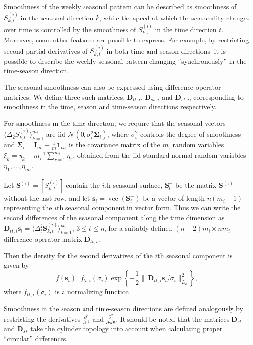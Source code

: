 \documentclass[11pt,a4paper,]{article}
\begin{document}
Smoothness of the weekly seasonal pattern can be described as smoothness of \(S^{(i)}_{k,t}\) in the seasonal direction \(k\), while the speed at which the seasonality changes over time is controlled by the smoothness of \(S^{(i)}_{k,t}\) in the time direction \(t\). Moreover, some other features are possible to express. For example, by restricting second partial derivatives of \(S^{(i)}_{k,t}\) in both time and season directions, it is possible to describe the weekly seasonal pattern changing ``synchronously'' in the time-season direction.

The seasonal smoothness can also be expressed using difference operator matrices. We define three such matrices, \(\bm{D}_{tt,i}\), \(\bm{D}_{ss,i}\) and \(\bm{D}_{st,i}\), corresponding to smoothness in the time, season and time-season directions respectively.

For smoothness in the time direction, we require that the seasonal vectors \(\langle \Delta_2 S^{(i)}_{k,t} \rangle_{k=1}^{m_i}\) are iid \(\mathcal{N}(0,\sigma_{i}^2 \bm{\Sigma}_{i} )\), where \(\sigma_i^2\) controls the degree of smoothness and \(\bm{\Sigma}_{i} = \bm{I}_{m_i} - \frac1m\bm{1}_{m_i}\) is the covariance matrix of the \(m_i\) random variables \(\xi_k = \eta_k - m_i^{-1}\sum\limits_{r = 1}^{m_i}\eta_r\), obtained from the iid standard normal random variables \(\eta_1,\dots,\eta_{m_i}\).

Let \(\bm{S}^{(i)} = [S_{k,t}^{(i)}]\) contain the \(i\)th seasonal surface, \(\bm{S}_i^{-}\) be the matrix \(\bm{S}^{(i)}\) without the last row, and let \(\bm{s}_i = \operatorname{vec}(\bm{S}_i^{-})\) be a vector of length \(n(m_i-1)\) representing the \(i\)th seasonal component in vector form. Thus we can write the second differences of the seasonal component along the time dimension as \(\bm{D}_{tt,i} \bm{s}_i = \langle \Delta^2_{t} \bm{S}^{(i)}_{k,t} \rangle_{k=1}^{m_i}\), \(3 \le t \le n\), for a suitably defined \((n-2)m_i \times nm_i\) difference operator matrix \(\bm{D}_{tt,i}\).

Then the density for the second derivatives of the \(i\)th seasonal component is given by
\[
  f(\bm{s}_i)_ =f_{tt,i}(\sigma_i) \exp\left\{-\frac{1}{2}\big\|\ \bm{D}_{tt,i}\bm{s}_i / \sigma_i\big\|_{L_2}^2\right\},
\]
where \(f_{tt,i}(\sigma_i)\) is a normalizing function.

Smoothness in the season and time-season directions are defined analogously by restricting the derivatives \(\frac{\partial^2}{\partial s^2}\) and \(\frac{\partial^2}{\partial s \partial t}\). It should be noted that the matrices \(\bm{D}_{st}\) and \(\bm{D}_{ss}\) take the cylinder topology into account when calculating proper ``circular'' differences.
\end{document}
